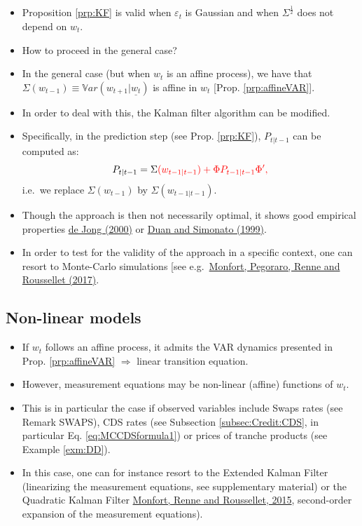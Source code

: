 \documentclass[
  12pt,
]{book}
\providecommand{\tightlist}{%
  \setlength{\itemsep}{0pt}\setlength{\parskip}{0pt}}
\theoremstyle{definition}
\theoremstyle{definition}
\theoremstyle{definition}
\theoremstyle{definition}
\theoremstyle{remark}
\begin{document}
\begin{itemize}
\tightlist
\item
  Proposition \ref{prp:KF} is valid when \(\varepsilon_t\) is Gaussian and when \(\Sigma^{\frac{1}{2}}\) does not depend on \(w_t\).
\item
  How to proceed in the general case?
\item
  In the general case (but when \(w_t\) is an affine process), we have that \(\Sigma(w_{t-1}) \equiv \mathbb{V}ar(w_{t+1}|\underline{w_t})\) is affine in \(w_t\) {[}Prop. \ref{prp:affineVAR}{]}.
\item
  In order to deal with this, the Kalman filter algorithm can be modified.
\item
  Specifically, in the prediction step (see Prop. \ref{prp:KF}), \(P_{t|t-1}\) can be computed as:
  \[
  P_{t|t-1} = \Sigma\color{red}{(w_{t-1|t-1})} + \Phi P_{t-1|t-1} \Phi',
  \]
  i.e.~we replace \(\Sigma(w_{t-1})\) by \(\Sigma(w_{t-1|t-1})\).
\item
  Though the approach is then not necessarily optimal, it shows good empirical properties \href{/href\%7Bhttp://link.springer.com/article/10.1023\%2FA\%3A1008304625054}{de Jong (2000)} or \href{https://www.jstor.org/stable/1392263?seq=1\#page_scan_tab_contents}{Duan and Simonato (1999)}.
\item
  In order to test for the validity of the approach in a specific context, one can resort to Monte-Carlo simulations {[}see e.g.~\href{https://www.sciencedirect.com/science/article/pii/S0304407617301653}{Monfort, Pegoraro, Renne and Roussellet (2017)}.
\end{itemize}

\hypertarget{nonlinear}{%
\subsection{Non-linear models}\label{nonlinear}}

\begin{itemize}
\tightlist
\item
  If \(w_t\) follows an affine process, it admits the VAR dynamics presented in Prop. \ref{prp:affineVAR} \(\Rightarrow\) linear transition equation.
\item
  However, measurement equations may be non-linear (affine) functions of \(w_t\).
\item
  This is in particular the case if observed variables include Swaps rates (see Remark SWAPS), CDS rates (see Subsection \ref{subsec:Credit:CDS}, in particular Eq. \eqref{eq:MCCDSformula1}) or prices of tranche products (see Example \ref{exm:DD}).
\item
  In this case, one can for instance resort to the Extended Kalman Filter (linearizing the measurement equations, see supplementary material) or the Quadratic Kalman Filter \href{https://www.sciencedirect.com/science/article/pii/S0304407615000123}{Monfort, Renne and Roussellet, 2015}, second-order expansion of the measurement equations).
\end{itemize}
\end{document}
